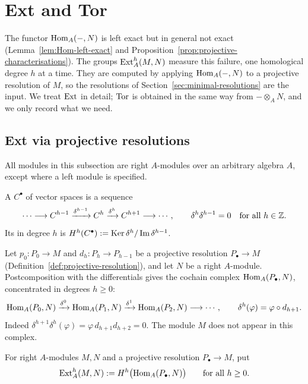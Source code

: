 \clearpage
\section{Ext and Tor}\label{sec:ext-tor}

The functor $\operatorname{Hom}\nolimits_A(-,N)$ is left exact but in general not exact (Lemma~\ref{lem:Hom-left-exact} and Proposition~\ref{prop:projective-characterisations}).
The groups $\operatorname{Ext}\nolimits_A^h(M,N)$ measure this failure, one homological degree $h$ at a time.
They are computed by applying $\operatorname{Hom}\nolimits_A(-,N)$ to a projective resolution of $M$, so the resolutions of Section~\ref{sec:minimal-resolutions} are the input.
We treat $\operatorname{Ext}\nolimits$ in detail; $\operatorname{Tor}\nolimits$ is obtained in the same way from $-\otimes_AN$, and we only record what we need.

\subsection{Ext via projective resolutions}

All modules in this subsection are right $A$-modules over an arbitrary algebra $A$, except where a left module is specified.

\begin{definition}\label{def:cochain-complex}
A  $C^\bullet$ of vector spaces is a sequence
\[
\cdots\longrightarrow C^{h-1}\xrightarrow{\delta^{h-1}}C^h
\xrightarrow{\delta^h}C^{h+1}\longrightarrow\cdots,
\qquad\delta^h\delta^{h-1}=0\quad\text{for all }h\in\mathbb{Z}.
\]
Its  in degree $h$ is $H^h(C^\bullet):=\operatorname{Ker}\nolimits\delta^h/\operatorname{Im}\nolimits\delta^{h-1}$.
\end{definition}

Let $p_0:P_0\to M$ and $d_h:P_h\to P_{h-1}$ be a projective resolution $P_\bullet\to M$ (Definition~\ref{def:projective-resolution}), and let $N$ be a right $A$-module.
Postcomposition with the differentials gives the cochain complex $\operatorname{Hom}\nolimits_A(P_\bullet,N)$, concentrated in degrees $h\geq0$:
\begin{equation}\label{eq:hom-complex}
\operatorname{Hom}\nolimits_A(P_0,N)\xrightarrow{\delta^0}\operatorname{Hom}\nolimits_A(P_1,N)\xrightarrow{\delta^1}\operatorname{Hom}\nolimits_A(P_2,N)\longrightarrow\cdots,
\qquad\delta^h(\varphi)=\varphi\circ d_{h+1}.
\end{equation}
Indeed $\delta^{h+1}\delta^h(\varphi)=\varphi\, d_{h+1}d_{h+2}=0$.
The module $M$ does not appear in this complex.

\begin{definition}\label{def:ext}
For right $A$-modules $M,N$ and a projective resolution $P_\bullet\to M$, put
\[
\operatorname{Ext}\nolimits_A^h(M,N):=H^h\bigl(\operatorname{Hom}\nolimits_A(P_\bullet,N)\bigr)\qquad\text{for all }h\geq0.
\]
\end{definition}

